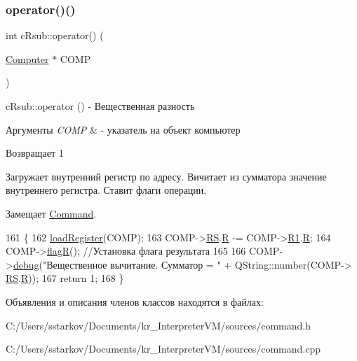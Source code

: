 \subsubsection{\texorpdfstring{operator()()}{operator()()}}
{\footnotesize\ttfamily int c\+Rsub\+::operator() (\begin{DoxyParamCaption}\item[{\hyperlink{class_computer}{Computer} $\ast$}]{C\+O\+MP }\end{DoxyParamCaption})\hspace{0.3cm}{\ttfamily [virtual]}}



c\+Rsub\+::operator () -\/ Вещественная разность 


\begin{DoxyParams}{Аргументы}
{\em C\+O\+MP} & -\/ указатель на объект компьютер \\
\hline
\end{DoxyParams}
\begin{DoxyReturn}{Возвращает}
1
\end{DoxyReturn}
Загружает внутренний регистр по адресу. Вичитает из сумматора значение внутреннего регистра. Ставит флаги операции. 

Замещает \hyperlink{class_command_a79939b66f3de892e91d7710844294716}{Command}.


\begin{DoxyCode}
161 \{
162     \hyperlink{class_command_aac6f368e7c9dbb357b3f00627d5dabfc}{loadRegister}(COMP);
163     COMP->\hyperlink{class_computer_a874503110664b3cf821118d2ce9c2b96}{RS}.\hyperlink{union_computer_1_1data_acbf8c96e22bd094bcbb4014818e3570d}{R} -= COMP->\hyperlink{class_computer_a0fbf84599b7db9d634a92afed443ee73}{R1}.\hyperlink{union_computer_1_1data_acbf8c96e22bd094bcbb4014818e3570d}{R};
164     COMP->\hyperlink{class_computer_aae860bb217270ec88e8ebf6fe2c2adc9}{flagR}(); \textcolor{comment}{//Установка флага результата}
165 
166     COMP->\hyperlink{class_computer_a10ca6c6b200630119201de16d7368e0f}{debug}(\textcolor{stringliteral}{"Вещественное вычитание. Сумматор = "} + QString::number(COMP->
      \hyperlink{class_computer_a874503110664b3cf821118d2ce9c2b96}{RS}.\hyperlink{union_computer_1_1data_acbf8c96e22bd094bcbb4014818e3570d}{R}));
167     \textcolor{keywordflow}{return} 1;
168 \}
\end{DoxyCode}


Объявления и описания членов классов находятся в файлах\+:\begin{DoxyCompactItemize}
\item 
C\+:/\+Users/sstarkov/\+Documents/kr\+\_\+\+Interpreter\+V\+M/sources/command.\+h\item 
C\+:/\+Users/sstarkov/\+Documents/kr\+\_\+\+Interpreter\+V\+M/sources/command.\+cpp\end{DoxyCompactItemize}
